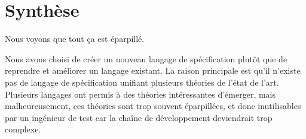 \section{Synthèse}
\label{section:sota:summary}

Nous voyons que tout ça est éparpillé.

Nous avons choisi de créer un nouveau langage de spécification plutôt que de
reprendre et améliorer un langage existant.
La raison principale est qu'il n'existe pas de langage de spécification unifiant
plusieurs théories de l'état de l'art. Plusieurs langages ont permis à des
théories intéressantes d'émerger, mais malheureusement, ces théories sont
trop souvent éparpillées, et donc inutilisables par un ingénieur de test car la
chaîne de développement deviendrait trop complexe.
